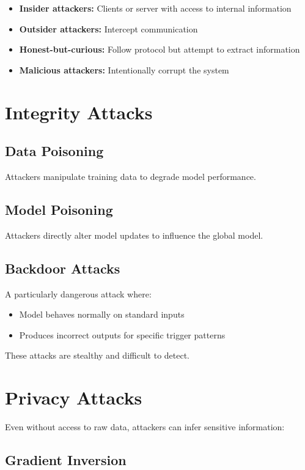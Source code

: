 \begin{itemize}
    \item \textbf{Insider attackers:} Clients or server with access to internal information
    \item \textbf{Outsider attackers:} Intercept communication
    \item \textbf{Honest-but-curious:} Follow protocol but attempt to extract information
    \item \textbf{Malicious attackers:} Intentionally corrupt the system
\end{itemize}

\section{Integrity Attacks}

\subsection{Data Poisoning}

Attackers manipulate training data to degrade model performance.

\subsection{Model Poisoning}

Attackers directly alter model updates to influence the global model.

\subsection{Backdoor Attacks}

A particularly dangerous attack where:
\begin{itemize}
    \item Model behaves normally on standard inputs
    \item Produces incorrect outputs for specific trigger patterns
\end{itemize}

These attacks are stealthy and difficult to detect.

\section{Privacy Attacks}

Even without access to raw data, attackers can infer sensitive information:

\subsection{Gradient Inversion}

